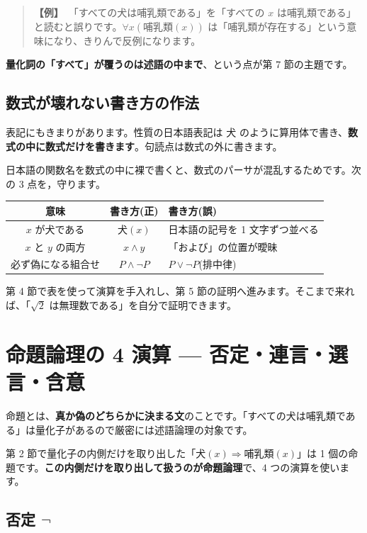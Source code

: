 \documentclass{article}
\begin{document}
\begin{quote}
\textbf{【例】}\ 「すべての犬は哺乳類である」を「すべての \(x\) は哺乳類である」と読むと誤りです。\(\forall x \left( \mathrm{哺乳類}(x) \right)\) は「哺乳類が存在する」という意味になり、きりんで反例になります。
\end{quote}

\textbf{量化詞の「すべて」が覆うのは述語の中まで}、という点が第 7 節の主題です。

\subsection{数式が壊れない書き方の作法}

表記にもきまりがあります。性質の日本語表記は \(\mathrm{犬}\) のように算用体で書き、\textbf{数式の中に数式だけを書きます}。句読点は数式の外に書きます。

日本語の関数名を数式の中に裸で書くと、数式のパーサが混乱するためです。次の 3 点を，守ります。

\begin{center}
\begin{tabular}{|c|c|l|}
\hline
意味 & 書き方(正) & 書き方(誤) \\
\hline
\(x\) が犬である & \(\mathrm{犬}(x)\) & 日本語の記号を 1 文字ずつ並べる \\
\(x\) と \(y\) の両方 & \(x \land y\) & 「および」の位置が曖昧 \\
必ず偽になる組合せ & \(P \land \neg P\) & \(P \lor \neg P\)(排中律) \\
\hline
\end{tabular}
\end{center}

第 4 節で表を使って演算を手入れし、第 5 節の証明へ進みます。そこまで来れば、「\(\sqrt{2}\) は無理数である」を自分で証明できます。

\section{命題論理の 4 演算 — 否定・連言・選言・含意}

命題とは、\textbf{真か偽のどちらかに決まる文}のことです。「すべての犬は哺乳類である」は量化子があるので厳密には述語論理の対象です。

第 2 節で量化子の内側だけを取り出した「\(\mathrm{犬}(x) \Rightarrow \mathrm{哺乳類}(x)\)」は 1 個の命題です。\textbf{この内側だけを取り出して扱うのが命題論理}で、4 つの演算を使います。

\subsection{否定 \(\neg\)}
\end{document}
